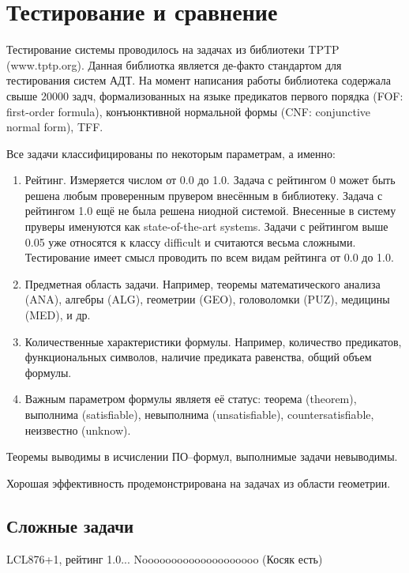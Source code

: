\section{Тестирование и сравнение}

Тестирование системы проводилось на задачах из библиотеки TPTP (www.tptp.org). Данная библиотка является де-факто стандартом для тестирования систем АДТ. На момент написания работы библиотека содержала свыше 20000 задч, формализованных на языке предикатов первого порядка (FOF: first-order formula), конъюнктивной нормальной формы (CNF: conjunctive normal form), TFF.

Все задачи классифицированы по некоторым параметрам, а именно:
\begin{enumerate}
\item Рейтинг. Измеряется числом от 0.0 до 1.0. Задача с рейтингом 0 может быть решена любым проверенным прувером внесённым в библиотеку. Задача с рейтингом 1.0 ещё не была решена ниодной системой. Внесенные в систему пруверы именуются как state-of-the-art systems. Задачи с рейтингом выше 0.05 уже относятся к классу difficult и считаются весьма сложными. Тестирование имеет смысл проводить по всем видам рейтинга от 0.0 до 1.0.
\item Предметная область задачи. Например, теоремы математического анализа (ANA), алгебры (ALG), геометрии (GEO), головоломки (PUZ), медицины (MED), и др.
\item Количественные характеристики формулы. Например, количество предикатов, функциональных символов, наличие предиката равенства, общий объем формулы.
\item Важным параметром формулы являетя её статус: теорема (theorem), выполнима (satisfiable), невыполнима (unsatisfiable), countersatisfiable, неизвестно (unknow).
\end{enumerate}

Теоремы выводимы в исчислении ПО--формул, выполнимые задачи невыводимы.

Хорошая эффективность продемонстрирована на задачах из области геометрии. 



\subsection{Сложные задачи}
LCL876+1, рейтинг 1.0... Noooooooooooooooooooo (Косяк есть)



